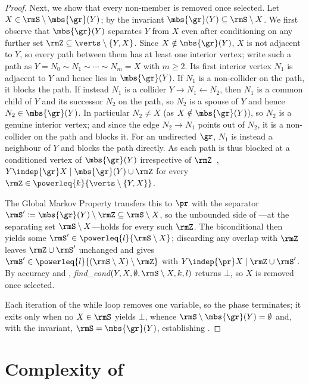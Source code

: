 \begin{proof}
  Next, we show that every non-member is removed once selected. Let
  $X\in\rmS\setminus\mbs{\gr}(Y)$; by the invariant
  $\mbs{\gr}(Y)\subseteq\rmS\setminus X$. We first observe that
  $\mbs{\gr}(Y)$ separates $Y$ from $X$ even after conditioning on any
  further set $\rmZ\subseteq\verts\setminus\{Y,X\}$. Since
  $X\notin\mbs{\gr}(Y)$, $X$ is not adjacent to $Y$, so every path
  between them has at least one interior vertex; write such a path as
  $Y=N_{0}\sim N_{1}\sim\cdots\sim N_{m}=X$ with $m\geq 2$. Its first
  interior vertex $N_{1}$ is adjacent to $Y$ and hence lies in
  $\mbs{\gr}(Y)$. If $N_{1}$ is a non-collider on the path, it blocks
  the path. If instead $N_{1}$ is a collider
  $Y\rightarrow N_{1}\leftarrow N_{2}$, then $N_{1}$ is a common child of
  $Y$ and its successor $N_{2}$ on the path, so $N_{2}$ is a spouse of
  $Y$ and hence $N_{2}\in\mbs{\gr}(Y)$. In particular $N_{2}\neq X$ (as
  $X\notin\mbs{\gr}(Y)$), so $N_{2}$ is a genuine interior vertex; and
  since the edge $N_{2}\rightarrow N_{1}$ points out of $N_{2}$, it is a
  non-collider on the path and blocks it. For an undirected $\gr$, $N_{1}$ is instead a neighbour of
  $Y$ and blocks the path directly. As each path is thus blocked at a
  conditioned vertex of $\mbs{\gr}(Y)$ irrespective of
  $\rmZ$~\citep{pearl1988,lauritzen1996},
  $Y\indep{\gr}X\mid\mbs{\gr}(Y)\cup\rmZ$ for every
  $\rmZ\in\powerleq{k}{\verts\setminus\{Y,X\}}$.

  The Global Markov
  Property transfers this to $\pr$ with the separator
  $\rmS'\coloneq\mbs{\gr}(Y)\setminus\rmZ\subseteq\rmS\setminus X$, so
  the unbounded side of ---at the separating set
  $\rmS\setminus X$---holds for every such $\rmZ$. The biconditional
  then yields some $\rmS'\in\powerleq{l}{\rmS\setminus X}$; discarding
  any overlap with $\rmZ$ leaves $\rmZ\cup\rmS'$ unchanged and gives
  $\rmS'\in\powerleq{l}{(\rmS\setminus X)\setminus\rmZ}$ with
  $Y\indep{\pr}X\mid\rmZ\cup\rmS'$. By accuracy and ,
  \textit{find\_cond}$(Y,X,\emptyset,\rmS\setminus X,k,l)$ returns
  $\bot$, so $X$ is removed once selected.

  Each iteration of the while loop removes one variable, so the phase
  terminates; it exits only when no $X\in\rmS$ yields $\bot$, whence
  $\rmS\setminus\mbs{\gr}(Y)=\emptyset$ and, with the invariant,
  $\rmS=\mbs{\gr}(Y)$, establishing .
\end{proof}

\section{Complexity of {\method}}\label{apx:proof-complex}

